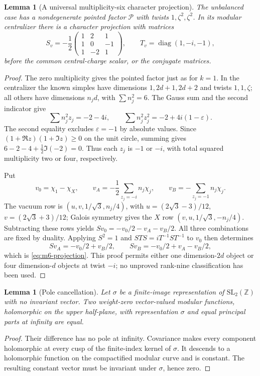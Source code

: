 \documentclass[11pt,a4paper]{article}
\newtheorem{lemma}[theorem]{Lemma}
\theoremstyle{definition}
\begin{document}
\begin{lemma}[A universal multiplicity-six character projection]
\label{lem:m6-projection}
The unbalanced case has a nondegenerate pointed factor $\mathcal P$
with twists $1,\zeta^2,\zeta^2$. In its modular centralizer there is
a character projection with matrices
\begin{equation}
 S_v=-\frac12\begin{pmatrix}1&2&1\\1&0&-1\\1&-2&1\end{pmatrix},
 \qquad T_v=\operatorname{diag}(1,-i,-1),
 \label{eq:m6-projection}
\end{equation}
before the common central-charge scalar, or the conjugate matrices.
\end{lemma}
\begin{proof}
The zero multiplicity gives the pointed factor just as for $k=1$.
In the centralizer the known simples have dimensions
$1,2d+1,2d+2$ and twists $1,1,\zeta$; all others have dimensions
$n_jd$, with $\sum n_j^2=6$.
The Gauss sum and the second indicator give
\[
 \sum n_j^2z_j=-2-4i,\qquad
 \sum n_j^2z_j^2=-2+4i(1-\varepsilon).
\]
The second equality excludes $\varepsilon=-1$ by absolute values.
Since $(1+\Re z)(1+\Im z)\ge0$ on the unit circle, summing gives
$6-2-4+\tfrac12\Im(-2)=0$. Thus each $z_j$ is $-1$ or $-i$,
with total squared multiplicity two or four, respectively.

Put
\[
 v_0=\chi_1-\chi_X,\qquad
 v_A=-\frac12\sum_{z_j=-i}n_j\chi_j,\qquad
 v_B=-\sum_{z_j=-1}n_j\chi_j.
\]
The vacuum row is $(u,v,1/\sqrt3,n_j/4)$, with
$u=(2\sqrt3-3)/12$, $v=(2\sqrt3+3)/12$; Galois symmetry gives
the $X$ row $(v,u,1/\sqrt3,-n_j/4)$.
Subtracting these rows yields
$Sv_0=-v_0/2-v_A-v_B/2$. All three combinations are fixed by
duality. Applying $S^2=1$ and
$STS=iT^{-1}ST^{-1}$ to $v_0$ then determines
\[
 Sv_A=-v_0/2+v_B/2,\qquad
 Sv_B=-v_0/2+v_A-v_B/2,
\]
which is \eqref{eq:m6-projection}. This proof permits either one
dimension-$2d$ object or four dimension-$d$ objects at twist $-i$;
no unproved rank-nine classification has been used.
\end{proof}

\begin{lemma}[Pole cancellation]\label{lem:pole-cancellation}
Let $\sigma$ be a finite-image representation of
$\mathrm{SL}_2(\mathbb Z)$ with no invariant vector. Two weight-zero
vector-valued modular functions, holomorphic on the upper half-plane,
with representation $\sigma$ and equal principal parts at infinity
are equal.
\end{lemma}
\begin{proof}
Their difference has no pole at infinity. Covariance makes every
component holomorphic at every cusp of the finite-index kernel of
$\sigma$. It descends to a holomorphic function on the compactified
modular curve and is constant. The resulting constant vector must be
invariant under $\sigma$, hence zero.
\end{proof}
\end{document}
